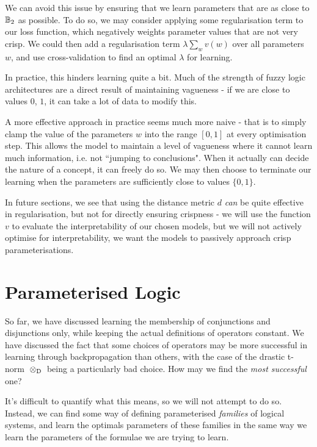\documentclass[conference]{report}
\begin{document}
We can avoid this issue by ensuring that we learn parameters that are as close to $\mathbb{B}_2$ as possible. To do so, we may consider applying some regularisation term to our loss function, which negatively weights parameter values that are not very crisp. We could then add a regularisation term $\lambda \sum_w v(w)$ over all parameters $w$, and use cross-validation to find an optimal $\lambda$ for learning.

In practice, this hinders learning quite a bit. Much of the strength of fuzzy logic architectures are a direct result of maintaining vagueness - if we are close to values $0$, $1$, it can take a lot of data to modify this.

A more effective approach in practice seems much more naive - that is to simply clamp the value of the parameters $w$ into the range $[0,1]$ at every optimisation step. This allows the model to maintain a level of vagueness where it cannot learn much information, i.e. not ``jumping to conclusions". When it actually can decide the nature of a concept, it can freely do so. We may then choose to terminate our learning when the parameters are sufficiently close to values $\{0,1\}$.

In future sections, we see that using the distance metric $d$ \textit{can} be quite effective in regularisation, but not for directly ensuring crispness - we will use the function $v$ to evaluate the interpretability of our chosen models, but we will not actively optimise for interpretability, we want the models to passively approach crisp parameterisations.

\section{Parameterised Logic}

So far, we have discussed learning the membership of conjunctions and disjunctions only, while keeping the actual definitions of operators constant. We have discussed the fact that some choices of operators may be more successful in learning through backpropagation than others, with the case of the drastic t-norm ${\mspace{4mu}\otimes_\text{D}\mspace{4mu}}$ being a particularly bad choice. How may we find the \textit{most successful} one? 

It's difficult to quantify what this means, so we will not attempt to do so. Instead, we can find some way of defining parameterised \textit{families} of logical systems, and learn the optimals parameters of these families in the same way we learn the parameters of the formulae we are trying to learn.
\end{document}
